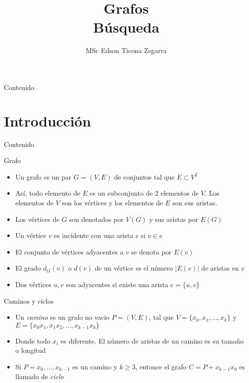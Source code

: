 \documentclass[]{beamer}
\title{Grafos\\B\'usqueda}
\author{MSc Edson Ticona Zegarra}
\institute{Taller avanzado 2025}
\date{}
\begin{document}
\maketitle

\begin{frame}{Contenido}
\tableofcontents
\end{frame}

\section{Introducci\'on}
\begin{frame}{Contenido}
\tableofcontents[currentsection]
\end{frame}

\begin{frame}{Grafo}
  \begin{itemize}
    \item Un grafo es un par $G=(V,E)$ de conjuntos tal que $E \subset V^2$
      \pause
    \item As\'i, todo elemento de $E$ es un subconjunto de 2 elementos de $V$. Los elementos de $V$ son los v\'ertices y los elementos de $E$ son sus aristas.
      \pause
    \item Los v\'ertices de $G$ son denotados por $V(G)$ y sus aristas por $E(G)$
      \pause
    \item Un v\'ertice $v$ es incidente con una arista $e$ si $v \in e$
      \pause
    \item El conjunto de v\'ertices adyacentes a $v$ se denota por $E(v)$
      \pause
    \item El grado $d_G(v)$ o $d(v)$ de un v\'ertice es el n\'umero $|E(v)|$ de aristas en $v$ 
      \pause
    \item Dos v\'ertices $u, v$ son adyacentes si existe una arista $e = \{u,v\}$
  \end{itemize}
\end{frame}

\begin{frame}{Caminos y ciclos}
  \begin{itemize}
    \item Un \textit{camino} es un grafo no vacio $P=(V,E)$, tal que $V=\{x_0, x_1, ..., x_k \}$ y $E = \{x_0x_1, x_1x_2, ..., x_{k-1}x_k \}$
      \pause
    \item Donde todo $x_i$ es diferente. El n\'umero de aristas de un camino es su tama\~no o longitud
      \pause
    \item Si $P = x_0, ..., x_{k-1}$ es un camino y $k\geq 3$, entonce el grafo $C = P + x_{k-1}x_0$ es llamado de \textit{ciclo}
  \end{itemize}
\end{frame}
\end{document}
